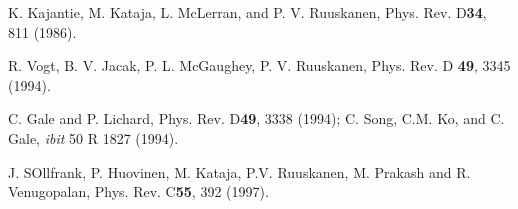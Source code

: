 \begin{thebibliography}{00}
 K. Kajantie, M. Kataja, L. McLerran, and P. V. Ruuskanen,
               Phys. Rev. D{\bf 34}, 811 (1986).

 R. Vogt, B. V. Jacak, P. L. McGaughey, P. V. Ruuskanen,
          Phys. Rev. D {\bf 49}, 3345 (1994).
          
 C. Gale and P. Lichard, Phys. Rev. D{\bf 49}, 3338 (1994);
               C. Song, C.M. Ko, and C. Gale, {\it ibit} 50 R 1827 (1994).
               
 J. SOllfrank, P. Huovinen, M. Kataja, P.V. Ruuskanen,
             M. Prakash and R. Venugopalan, 
             Phys. Rev. C{\bf 55}, 392 (1997).

\end{thebibliography}






